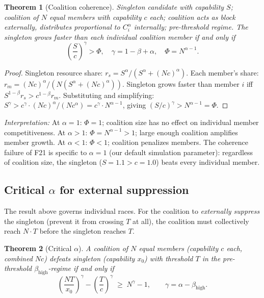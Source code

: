 \documentclass[11pt,letterpaper]{article}
\theoremstyle{plain}
\newtheorem{theorem}{Theorem}[section]
\theoremstyle{definition}
\theoremstyle{remark}
\newcommand{\betaH}{\beta_{\mathrm{high}}}
\begin{document}
\begin{theorem}[Coalition coherence]
\label{thm:coalcoherence}
Singleton candidate with capability $S$; coalition of $N$ equal members with
capability $c$ each; coalition acts as block externally, distributes
proportional to $C_i^\alpha$ internally; pre-threshold regime.
The singleton grows faster than each individual coalition member if and only if
\[
  \left(\frac{S}{c}\right)^\gamma > \Phi, \quad \gamma = 1 - \beta + \alpha,
  \quad \Phi = N^{\alpha-1}.
\]
\end{theorem}

\begin{proof}
Singleton resource share: $r_s = S^\alpha/(S^\alpha + (Nc)^\alpha)$.
Each member's share: $r_m = (Nc)^\alpha / (N(S^\alpha + (Nc)^\alpha))$.
Singleton grows faster than member $i$ iff
$S^{1-\beta} r_s > c^{1-\beta} r_m$.
Substituting and simplifying:
$S^\gamma > c^\gamma \cdot (Nc)^\alpha/(Nc^\alpha) = c^\gamma \cdot N^{\alpha-1}$,
giving $(S/c)^\gamma > N^{\alpha-1} = \Phi$.
\end{proof}

\textit{Interpretation:}
At $\alpha = 1$: $\Phi = 1$; coalition size has no effect on individual
member competitiveness.
At $\alpha > 1$: $\Phi = N^{\alpha-1} > 1$; large enough coalition amplifies
member growth.
At $\alpha < 1$: $\Phi < 1$; coalition penalizes members.
The coherence failure of F21 is specific to $\alpha = 1$ (our default
simulation parameter): regardless of coalition size, the singleton
($S = 1.1 > c = 1.0$) beats every individual member.

\subsection{Critical $\alpha$ for external suppression}
\label{sec:criticalalpha}

The result above governs individual races.
For the coalition to \emph{externally suppress} the singleton (prevent it from
crossing $T$ at all), the coalition must collectively reach $N\cdot T$
before the singleton reaches $T$.

\begin{theorem}[Critical $\alpha$]
\label{thm:criticalalpha}
A coalition of $N$ equal members (capability $c$ each, combined $Nc$) defeats
singleton (capability $x_0$) with threshold $T$ in the pre-threshold
$\betaH$-regime if and only if
\begin{equation}
  \left(\frac{NT}{x_0}\right)^\gamma - \left(\frac{T}{c}\right)^\gamma
  \;\geq\; N^\gamma - 1,
  \qquad \gamma = \alpha - \betaH.
  \label{eq:criticalalpha}
\end{equation}
\end{theorem}
\end{document}
